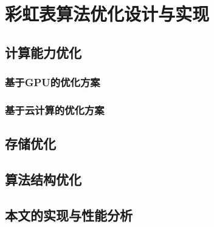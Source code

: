 \chapter{彩虹表算法优化设计与实现}
\section{计算能力优化}
	\subsection{基于GPU的优化方案}
	\subsection{基于云计算的优化方案}
\section{存储优化}
\section{算法结构优化}
\section{本文的实现与性能分析}
